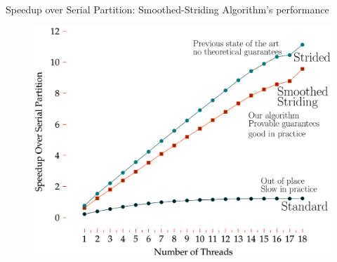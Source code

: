 \documentclass[xcolor=x11names, svgnames, rgb]{beamer}
\newcommand{\defn}[1]       {{\textit{\textbf{\boldmath #1}}}}
\newtheorem{defin}{Definition}
\begin{document}
\begin{frame}[t]{Speedup over Serial Partition: Smoothed-Striding Algorithm's performance}
	\begin{figure}
		\begin{center}
			\includegraphics[width=0.9\linewidth]{imgs/compiledGraph.eps}
		\end{center}
	\end{figure}
\end{frame}


\end{document}
